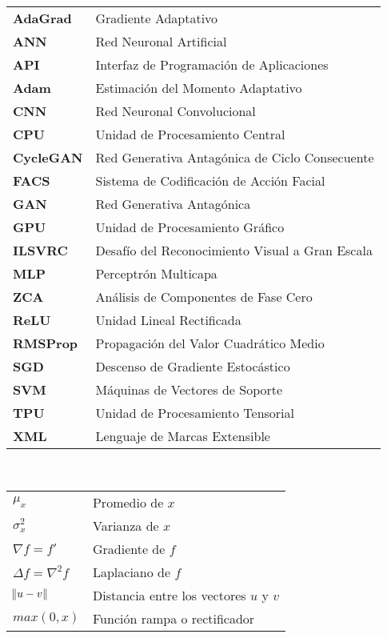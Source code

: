 \thispagestyle{plain}

\begin{abbreviations}
\begin{tabular}{l l}
    \\
    \textbf{AdaGrad} & Gradiente Adaptativo \\
    \textbf{ANN} & Red Neuronal Artificial \\
    \textbf{API} & Interfaz de Programación de Aplicaciones \\
    \textbf{Adam} & Estimación del Momento Adaptativo \\
    \textbf{CNN} & Red Neuronal Convolucional \\
    \textbf{CPU} & Unidad de Procesamiento Central \\
    \textbf{CycleGAN} & Red Generativa Antagónica de Ciclo Consecuente \\
    \textbf{FACS} & Sistema de Codificación de Acción Facial \\
    \textbf{GAN} & Red Generativa Antagónica \\
    \textbf{GPU} & Unidad de Procesamiento Gráfico \\
    \textbf{ILSVRC} & Desafío del Reconocimiento Visual a Gran Escala \\
    \textbf{MLP} & Perceptrón Multicapa \\
    \textbf{ZCA} & Análisis de Componentes de Fase Cero \\
    \textbf{ReLU} & Unidad Lineal Rectificada \\
    \textbf{RMSProp} & Propagación del Valor Cuadrático Medio \\
    \textbf{SGD} & Descenso de Gradiente Estocástico \\
    \textbf{SVM} & Máquinas de Vectores de Soporte \\
    \textbf{TPU} & Unidad de Procesamiento Tensorial \\
    \textbf{XML} & Lenguaje de Marcas Extensible \\

\end{tabular}
\end{abbreviations}
\\
\begin{mathexprs}
\begin{tabular}{l l}
    \textbf{$\mu_x$} & Promedio de $x$ \\
    \textbf{$\sigma_{x}^{2}$} & Varianza de $x$ \\
    \textbf{$\nabla f = f'$} & Gradiente de $f$ \\
    \textbf{$\Delta f = \nabla^2 f$} & Laplaciano de $f$ \\
    \textbf{$\norm{u - v}$} & Distancia entre los vectores $u$ y $v$ \\
    \textbf{$max(0, x)$} & Función rampa o rectificador \\
    
  
\end{tabular}
\end{mathexprs}
